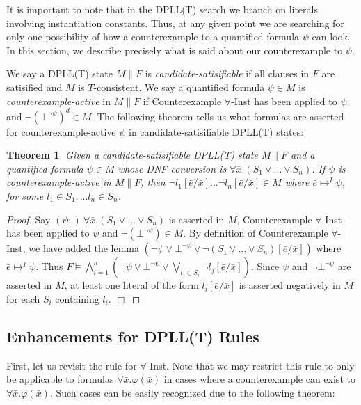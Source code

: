 \documentclass{llncs}
\newtheorem{thm}{Theorem}
\begin{document}
It is important to note that in the DPLL(T) search we branch on literals involving instantiation constants.
Thus, at any given point we are searching for only one possibility of how a counterexample to a quantified formula $\psi$ can look.
In this section, we describe precisely what is said about our counterexample to $\psi$.

We say a DPLL(T) state $M \parallel F$ is \emph{candidate-satisifiable} if all clauses in $F$ are satisified and $M$ is $T$-consistent.
We say a quantified formula $\psi \in M$ is \emph{counterexample-active} in $M \parallel F$ if Counterexample $\forall$-Inst has been applied to $\psi$ and $\neg (\bot^{\neg \psi})^d \in M$.
The following theorem tells us what formulas are asserted for counterexample-active $\psi$ in candidate-satisifiable DPLL(T) states:

\begin{thm}
\label{thm:cerep}
Given a candidate-satisifiable DPLL(T) state $M \parallel F$ and a quantified formula $\psi \in M$ whose DNF-conversion is $\forall \bar{x}. (S_1 \vee \ldots \vee S_n)$.
If $\psi$ is counterexample-active in $M \parallel F$, then $\neg l_1 [\bar{e}/\bar{x}] \ldots \neg l_n [\bar{e}/\bar{x}] \in M$ where $\bar{e} \mapsto^I \psi$, for some $l_1 \in S_1, \ldots l_n \in S_n$.
\end{thm}
\begin{proof}
Say $(\psi :) \ \forall \bar{x}. (S_1 \vee \ldots \vee S_n)$ is asserted in $M$, Counterexample $\forall$-Inst has been applied to $\psi$ and $\neg (\bot^{\neg \psi}) \in M$.
By definition of Counterexample $\forall$-Inst, we have added the lemma $( \neg \psi \vee \bot^{\neg \psi} \vee \neg (S_1 \vee \ldots \vee S_n )[\bar{e}/\bar{x}] )$ where $\bar{e} \mapsto^I \psi$.
Thus $F \models \displaystyle\bigwedge\limits_{i=1}^n ( \neg \psi \vee \bot^{\neg \psi} \vee \displaystyle\bigvee\limits_{l_j \in S_i} \neg l_j[\bar{e}/\bar{x}])$.
Since $\psi$ and $\neg \bot^{\neg \psi}$ are asserted in $M$, at least one literal of the form $l_i[\bar{e}/\bar{x}]$ is asserted negatively in $M$ for each $S_i$ containing $l_i$. $\Box$
\end{proof}

\subsection{Enhancements for DPLL(T) Rules}

First, let us revisit the rule for $\forall$-Inst.
Note that we may restrict this rule to only be applicable to formulas $\forall \bar{x}. \varphi( \bar{ x } )$ in cases where a counterexample can exist to $\forall \bar{x}. \varphi( \bar{ x } )$.
Such cases can be easily recognized due to the following theorem:
\end{document}
